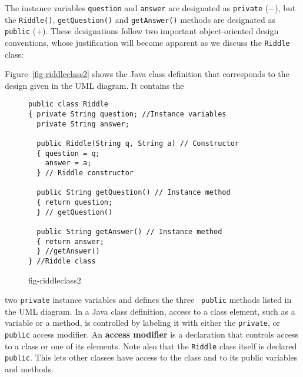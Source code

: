 The instance variables {\tt question} and {\tt answer} are designated
as {\tt private} ($-$), but the {\tt Riddle()}, {\tt getQuestion()}
and {\tt getAnswer()} methods are designated as {\tt public}
($+$). These designations follow two important object-oriented design
conventions, whose justification will become apparent as we
discuss the {\tt Riddle} class: 




Figure~\ref{fig-riddleclass2} shows the Java class definition that
corresponds to the design given in the UML diagram.  It contains the
\begin{figure}[h!]
\jjjprogstart
\begin{jjjlisting}
\begin{lstlisting}
public class Riddle
{ private String question; //Instance variables
  private String answer;

  public Riddle(String q, String a) // Constructor
  { question = q;
    answer = a;
  } // Riddle constructor

  public String getQuestion() // Instance method
  { return question;
  } // getQuestion()

  public String getAnswer() // Instance method
  { return answer;
  } //getAnswer()
} //Riddle class
\end{lstlisting}
\end{jjjlisting}
{fig-riddleclass2}
\end{figure}
two {\tt private} instance variables and defines the three {\tt
public} methods listed in the UML diagram. In a Java class definition,
access to a class element, such as a variable or a method, is
controlled by labeling it with either the {\tt private}, or {\tt
public} access modifier. An {\bf access modifier} is a declaration
that controls access to a class or one of its elements.  Note also
that the {\tt Riddle} class itself is declared {\tt public}.  This
lets other classes have access to the class and to its public
variables and methods.


